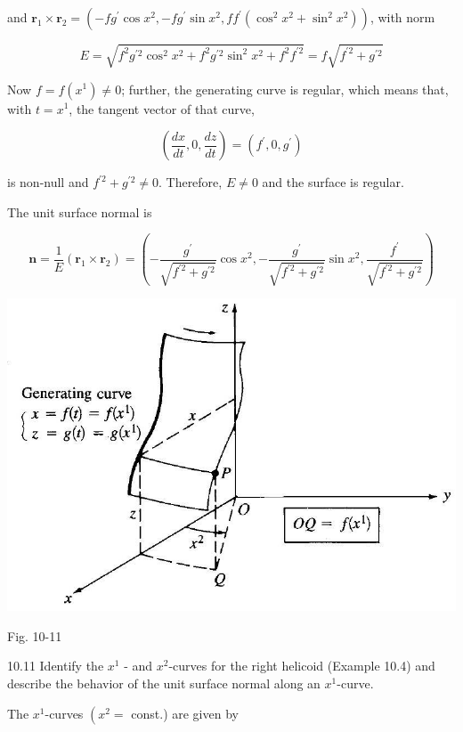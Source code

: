 \documentclass[10pt]{article}
\begin{document}
and $\mathbf{r}_{1} \times \mathbf{r}_{2}=\left(-f g^{\prime} \cos x^{2},-f g^{\prime} \sin x^{2}, f f^{\prime}\left(\cos ^{2} x^{2}+\sin ^{2} x^{2}\right)\right)$, with norm

$$
E=\sqrt{f^{2} g^{\prime 2} \cos ^{2} x^{2}+f^{2} g^{\prime 2} \sin ^{2} x^{2}+f^{2} f^{\prime 2}}=f \sqrt{f^{\prime 2}+g^{\prime 2}}
$$

Now $f=f\left(x^{1}\right) \neq 0$; further, the generating curve is regular, which means that, with $t=x^{1}$, the tangent vector of that curve,

$$
\left(\frac{d x}{d t}, 0, \frac{d z}{d t}\right)=\left(f^{\prime}, 0, g^{\prime}\right)
$$

is non-null and $f^{\prime 2}+g^{\prime 2} \neq 0$. Therefore, $E \neq 0$ and the surface is regular.

The unit surface normal is

$$
\mathbf{n}=\frac{1}{E}\left(\mathbf{r}_{1} \times \mathbf{r}_{2}\right)=\left(-\frac{g^{\prime}}{\sqrt{f^{\prime 2}+g^{\prime 2}}} \cos x^{2},-\frac{g^{\prime}}{\sqrt{f^{\prime 2}+g^{\prime 2}}} \sin x^{2}, \frac{f^{\prime}}{\sqrt{f^{\prime 2}+g^{\prime 2}}}\right)
$$

\begin{center}
\includegraphics[max width=\textwidth]{2024_04_03_41f90be4f896e21f0dc9g-153(1)}
\end{center}

Fig. 10-11

10.11 Identify the $x^{1}$ - and $x^{2}$-curves for the right helicoid (Example 10.4) and describe the behavior of the unit surface normal along an $x^{1}$-curve.

The $x^{1}$-curves $\left(x^{2}=\right.$ const.) are given by
\end{document}
